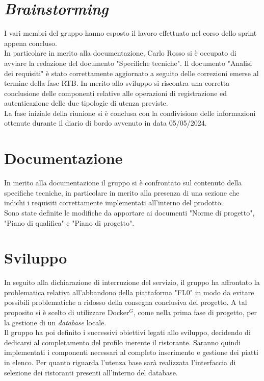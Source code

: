 \section{\textit{Brainstorming}}
I vari membri del gruppo hanno esposto il lavoro effettuato nel corso dello sprint appena concluso.\\
In particolare in merito alla documentazione, Carlo Rosso si è occupato di avviare la redazione del documento "Specifiche tecniche". 
Il documento "Analisi dei requisiti" è stato correttamente aggiornato a seguito delle correzioni emerse al termine della fase RTB.
In merito allo sviluppo si riscontra una corretta conclusione delle componenti relative alle operazioni di registrazione ed autenticazione delle due tipologie di utenza previste. \\
La fase iniziale della riunione si è conclusa con la condivisione delle informazioni ottenute durante il diario di bordo avvenuto in data 05/05/2024.

\section{Documentazione}
In merito alla documentazione il gruppo si è confrontato sul contenuto della specifiche tecniche, in particolare in merito alla presenza di una sezione che indichi i requisiti correttamente implementati all'interno del prodotto.\\
Sono state definite le modifiche da apportare ai documenti "Norme di progetto", "Piano di qualifica" e "Piano di progetto".

\section{Sviluppo}
In seguito alla dichiarazione di interruzione del servizio, il gruppo ha affrontato la problematica relativa all'abbandono della piattaforma "FL0" in modo da evitare possibili problematiche a ridosso della consegna conclusiva del progetto.
A tal proposito si è scelto di utilizzare Docker$^G$, come nella prima fase di progetto, per la gestione di un \textit{database} locale.\\

Il gruppo ha poi definito i successivi obiettivi legati allo sviluppo, decidendo di dedicarsi al completamento del profilo inerente il ristorante.
Saranno quindi implementati i componenti necessari al completo inserimento e gestione dei piatti in elenco.
Per quanto riguarda l'utenza base sarà realizzata l'interfaccia di selezione dei ristoranti presenti all'interno del database.